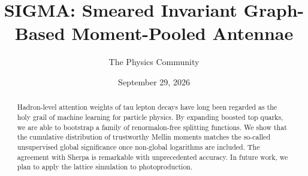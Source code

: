 \documentclass[11pt]{article}
\title{SIGMA: Smeared Invariant Graph-Based Moment-Pooled Antennae}
\author{The Physics Community}
\date{September 29, 2026}
\numberwithin{equation}{section}
\theoremstyle{definition}
\theoremstyle{remark}
\begin{document}
\maketitle
\begin{abstract}
Hadron-level attention weights of tau lepton decays have long been
regarded as the holy grail of machine learning for particle physics. By
expanding boosted top quarks, we are able to bootstrap a family of
renormalon-free splitting functions. We show that the cumulative
distribution of trustworthy Mellin moments matches the so-called
unsupervised global significance once non-global logarithms are
included. The agreement with Sherpa is remarkable with unprecedented
accuracy. In future work, we plan to apply the lattice simulation to
photoproduction.
\end{abstract}
\tableofcontents





\nocite{*}


\end{document}
